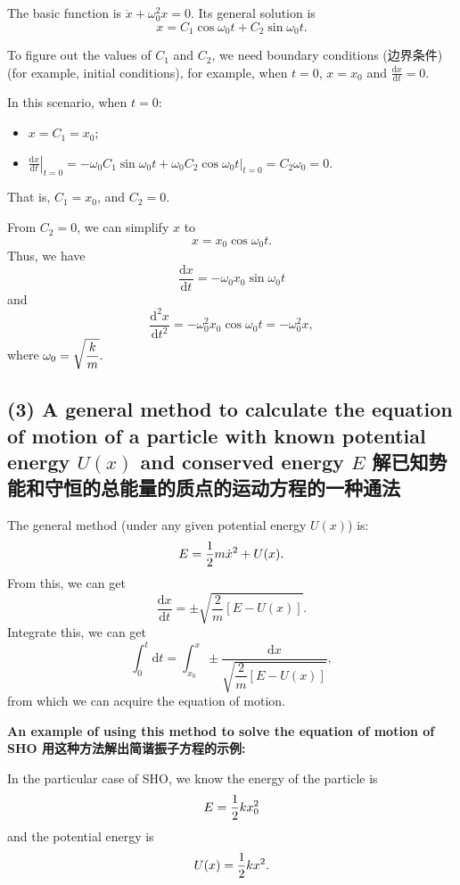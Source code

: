 The basic function is \(\ddot{x} + \omega_0^2 x = 0\). Its general
solution is \[x = C_1 \cos \omega_0 t + C_2 \sin \omega_0 t.\]

To figure out the values of \(C_1\) and \(C_2\), we need boundary
conditions (边界条件) (for example, initial conditions), for example,
when \(t = 0\), \(x = x_0\) and
\(\displaystyle \frac{\mathrm{d}x}{\mathrm{d}t} = 0\).

In this scenario, when \(t = 0\):
\begin{itemize}
    \item \(x = C_1 = x_0\);
    \item \(\displaystyle \left. \frac{\mathrm{d}x}{\mathrm{d}t} \right|_{t = 0} = - \omega_0 C_1 \sin \omega_0 t + \omega_0 C_2 \cos \omega_0 t \Big|_{t = 0} = C_2 \omega_0 = 0\).
\end{itemize}

That is, \(C_1 = x_0\), and \(C_2 = 0\).

From \(C_2 = 0\), we can simplify \(x\) to \[x = x_0 \cos \omega_0 t.\]
Thus, we have
\[\frac{\mathrm{d}x}{\mathrm{d}t} = - \omega_0 x_0 \sin \omega_0 t\] and
\[\frac{\mathrm{d}^2 x}{\mathrm{d}t^2} = - \omega_0^2 x_0 \cos \omega_0 t = - \omega_0^2 x,\]
where \(\displaystyle \omega_0 = \sqrt{k \over m}.\)

\subsection*{(3) A general method to calculate the
equation of motion of a particle with known potential energy \(U(x)\)
and conserved energy \(E\)
解已知势能和守恒的总能量的质点的运动方程的一种通法}\label{a-general-method-to-calculate-the-equation-of-motion-of-a-particle-with-known-potential-energy-ux-and-conserved-energy-e-ux89e3ux5df2ux77e5ux52bfux80fdux548cux5b88ux6052ux7684ux603bux80fdux91cfux7684ux8d28ux70b9ux7684ux8fd0ux52a8ux65b9ux7a0bux7684ux4e00ux79cdux901aux6cd5}

The general method (under any given potential energy \(U(x)\)) is:
\[E = {1 \over 2} m \dot{x}^2 + U(x).\] From this, we can get
\[\frac{\mathrm{d}x}{\mathrm{d}t}  = \pm \sqrt{\frac{2}{m}[E - U(x)]}.\]
Integrate this, we can get
\[\int_{0}^{t} \mathrm{d}t = \int_{x_0}^{x} \pm \frac{\mathrm{d}x}{\sqrt{\dfrac{2}{m}[E - U(x)]}},\]
from which we can acquire the equation of motion.

\textbf{An example of using this method to solve the equation of motion
of SHO 用这种方法解出简谐振子方程的示例:}

In the particular case of SHO, we know the energy of the particle is
\[E = {1 \over 2} k x_0^2\] and the potential energy is
\[U(x) = {1 \over 2} k x^2.\]

